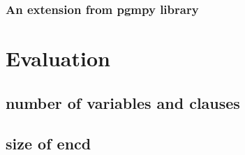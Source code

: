 \subsubsection{An extension from pgmpy library}



\section{Evaluation}
\subsection{number of variables and clauses}
\subsection{size of encd}